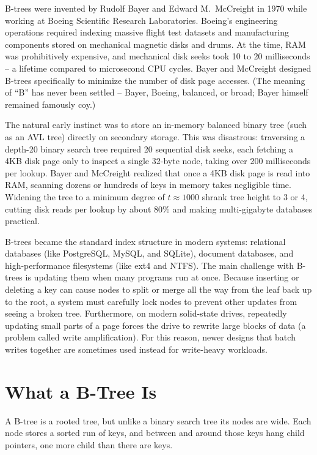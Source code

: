 \begin{historybox}
B-trees were invented by Rudolf Bayer and Edward M.~McCreight in 1970 while working at Boeing Scientific Research Laboratories. Boeing's engineering operations required indexing massive flight test datasets and manufacturing components stored on mechanical magnetic disks and drums. At the time, RAM was prohibitively expensive, and mechanical disk seeks took 10 to 20 milliseconds -- a lifetime compared to microsecond CPU cycles. Bayer and McCreight designed B-trees specifically to minimize the number of disk page accesses. (The meaning of ``B'' has never been settled -- Bayer, Boeing, balanced, or broad; Bayer himself remained famously coy.)

The natural early instinct was to store an in-memory balanced binary tree (such as an AVL tree) directly on secondary storage. This was disastrous: traversing a depth-20 binary search tree required 20 sequential disk seeks, each fetching a 4KB disk page only to inspect a single 32-byte node, taking over 200 milliseconds per lookup. Bayer and McCreight realized that once a 4KB disk page is read into RAM, scanning dozens or hundreds of keys in memory takes negligible time. Widening the tree to a minimum degree of $t \approx 1000$ shrank tree height to 3 or 4, cutting disk reads per lookup by about 80\% and making multi-gigabyte databases practical.

B-trees became the standard index structure in modern systems: relational databases (like PostgreSQL, MySQL, and SQLite), document databases, and high-performance filesystems (like ext4 and NTFS). The main challenge with B-trees is updating them when many programs run at once. Because inserting or deleting a key can cause nodes to split or merge all the way from the leaf back up to the root, a system must carefully lock nodes to prevent other updates from seeing a broken tree. Furthermore, on modern solid-state drives, repeatedly updating small parts of a page forces the drive to rewrite large blocks of data (a problem called write amplification). For this reason, newer designs that batch writes together are sometimes used instead for write-heavy workloads.
\end{historybox}

\section{What a B-Tree Is}

A B-tree is a rooted tree, but unlike a
binary search tree its nodes are wide. Each node stores a sorted run of keys, and
between and around those keys hang child pointers, one more child than there are
keys.

